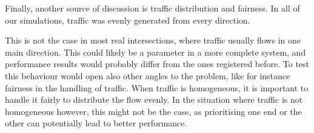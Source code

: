 Finally, another source of discussion is traffic distribution and fairness.
In all of our simulations, traffic was evenly generated from every direction.

This is not the case in most real intersections, where traffic usually flows in one main direction.
This could likely be a parameter in a more complete system, and performance results would probably differ from the ones registered before.
To test this behaviour would open also other angles to the problem, like for instance fairness in the handling of traffic.
When traffic is homogeneous, it is important to handle it fairly to distribute the flow evenly.
In the situation where traffic is not homogeneous however, this might not be the case, as prioritising one end or the other can potentially lead to better performance. 

